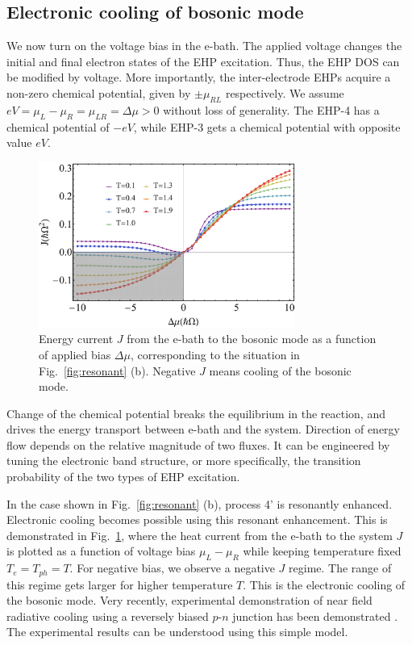 \documentclass[aps,prb,
,floatfix,footinbib,shortbibliography,
preprint
]{revtex4-1}
\begin{document}

\subsection{Electronic cooling of bosonic mode}
We now turn on the voltage bias in the e-bath.
The applied voltage changes the initial and final electron states of the EHP excitation. Thus, the EHP DOS can be modified by voltage. More importantly, the inter-electrode EHPs acquire a non-zero chemical potential, given by $\pm \mu_{RL}$ respectively. We assume $eV=\mu_L-\mu_R=\mu_{LR}= \Delta \mu>0$ without loss of generality. The EHP-4 has a chemical potential of $-eV$, while EHP-3 gets a chemical potential with opposite value $eV$. 
\begin{figure}[h]
	\includegraphics[width=0.75\textwidth,angle=0]{figures-0317/fig_5.pdf}	
	\caption{Energy current $J$ from the e-bath to the bosonic mode as a function of applied bias $\Delta \mu$, corresponding to the situation in Fig.~\ref{fig:resonant} (b). Negative $J$ means cooling of the bosonic mode.  }
	\label{fig:cooling}
\end{figure}
Change of the chemical potential breaks the equilibrium in the reaction, and drives the energy transport between e-bath and the system. 
Direction of energy flow depends on the relative magnitude of two fluxes. It can be engineered by tuning the electronic band structure, or more specifically, the transition probability of the two types of EHP excitation. 

In the case shown in Fig.~\ref{fig:resonant} (b), process 4' is resonantly enhanced. Electronic cooling becomes possible using this resonant enhancement. This is demonstrated in Fig.~\ref{fig:cooling}, where the heat current from the e-bath to the system $J$ is plotted as a function of voltage bias $\mu_L-\mu_R$ while keeping temperature fixed $T_e=T_{ph}=T$. For negative bias, we observe a negative $J$ regime. The range of this regime gets larger for higher temperature $T$. This is the electronic cooling of the bosonic mode. Very recently, experimental demonstration of near field radiative cooling using a reversely biased $p$-$n$ junction has been demonstrated \cite{zhu2019near}. The experimental results can be understood using this simple model.
\end{document}

